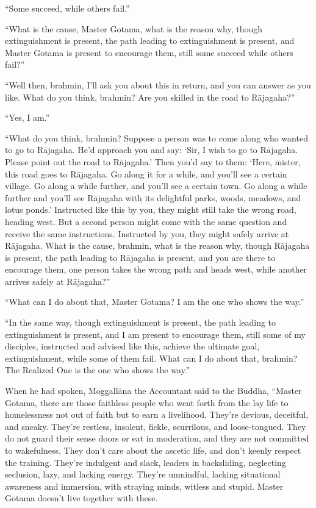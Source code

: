 \documentclass[12pt,openany]{book}%
\begin{document}
“Some succeed, while others fail.” 

“What is the cause, Master Gotama, what is the reason why, though extinguishment is present, the path leading to extinguishment is present, and Master Gotama is present to encourage them, still some succeed while others fail?” 

“Well then, brahmin, I’ll ask you about this in return, and you can answer as you like. What do you think, brahmin? Are you skilled in the road to \textsanskrit{Rājagaha}?” 

“Yes, I am.” 

“What do you think, brahmin? Suppose a person was to come along who wanted to go to \textsanskrit{Rājagaha}. He’d approach you and say: ‘Sir, I wish to go to \textsanskrit{Rājagaha}. Please point out the road to \textsanskrit{Rājagaha}.’ Then you’d say to them: ‘Here, mister, this road goes to \textsanskrit{Rājagaha}. Go along it for a while, and you’ll see a certain village. Go along a while further, and you’ll see a certain town. Go along a while further and you’ll see \textsanskrit{Rājagaha} with its delightful parks, woods, meadows, and lotus ponds.’ Instructed like this by you, they might still take the wrong road, heading west. But a second person might come with the same question and receive the same instructions. Instructed by you, they might safely arrive at \textsanskrit{Rājagaha}. What is the cause, brahmin, what is the reason why, though \textsanskrit{Rājagaha} is present, the path leading to \textsanskrit{Rājagaha} is present, and you are there to encourage them, one person takes the wrong path and heads west, while another arrives safely at \textsanskrit{Rājagaha}?” 

“What can I do about that, Master Gotama? I am the one who shows the way.” 

“In the same way, though extinguishment is present, the path leading to extinguishment is present, and I am present to encourage them, still some of my disciples, instructed and advised like this, achieve the ultimate goal, extinguishment, while some of them fail. What can I do about that, brahmin? The Realized One is the one who shows the way.” 

When he had spoken, \textsanskrit{Moggallāna} the Accountant said to the Buddha, “Master Gotama, there are those faithless people who went forth from the lay life to homelessness not out of faith but to earn a livelihood. They’re devious, deceitful, and sneaky. They’re restless, insolent, fickle, scurrilous, and loose-tongued. They do not guard their sense doors or eat in moderation, and they are not committed to wakefulness. They don’t care about the ascetic life, and don’t keenly respect the training. They’re indulgent and slack, leaders in backsliding, neglecting seclusion, lazy, and lacking energy. They’re unmindful, lacking situational awareness and immersion, with straying minds, witless and stupid. Master Gotama doesn’t live together with these. 
\end{document}
